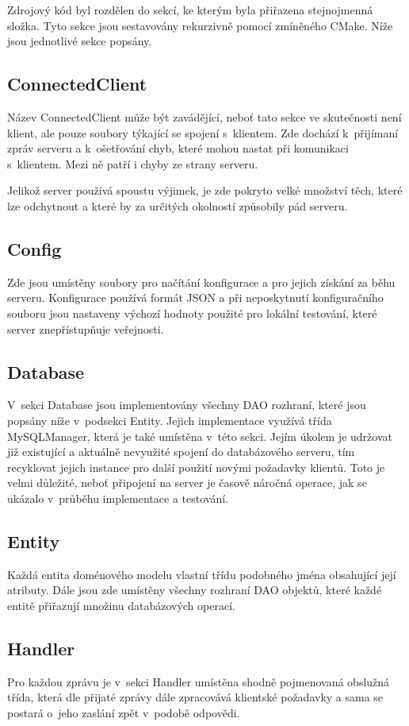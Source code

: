 \documentclass[thesis=B,czech]{FITthesis}[2013/10/20]
\begin{document}
Zdrojový kód byl rozdělen do sekcí, ke kterým byla přiřazena stejnojmenná složka. Tyto sekce jsou sestavovány rekurzivně pomocí zmíněného CMake. Níže jsou jednotlivé sekce popsány. 

\subsection{ConnectedClient}
Název ConnectedClient může být zavádějící, neboť tato sekce ve skutečnosti není klient, ale pouze soubory týkající se spojení s~klientem. Zde dochází k~přijímaní zpráv serveru a k~ošetřování chyb, které mohou nastat při komunikaci s~klientem. Mezi ně patří i chyby ze strany serveru.

Jelikož server používá spoustu výjimek, je zde pokryto velké množství těch, které lze odchytnout a které by za určitých okolností způsobily pád serveru.

\subsection{Config}
Zde jsou umístěny soubory pro načítání konfigurace a pro jejich získání za běhu serveru. Konfigurace používá formát JSON a při neposkytnutí konfiguračního souboru jsou nastaveny výchozí hodnoty použité pro lokální testování, které server znepřístupňuje veřejnosti.

\subsection{Database}
V~sekci Database jsou implementovány všechny DAO rozhraní, které jsou popsány níže v~podsekci Entity. Jejich implementace využívá třída MySQLManager, která je také umístěna v~této sekci. Jejím úkolem je udržovat již existující a aktuálně nevyužité spojení do databázového serveru, tím recyklovat jejich instance pro další použití novými požadavky klientů. Toto je velmi důležité, neboť připojení na server je časově náročná operace, jak se ukázalo v~průběhu implementace a testování.

\subsection{Entity}
Každá entita doménového modelu vlastní třídu podobného jména obsahující její atributy. Dále jsou zde umístěny všechny rozhraní DAO objektů, které každé entitě přiřazují množinu databázových operací.

\subsection{Handler}
Pro každou zprávu je v~sekci Handler umístěna shodně pojmenovaná obslužná třída, která dle přijaté zprávy dále zpracovává klientské požadavky a sama se postará o~jeho zaslání zpět v~podobě odpovědi.
\end{document}

